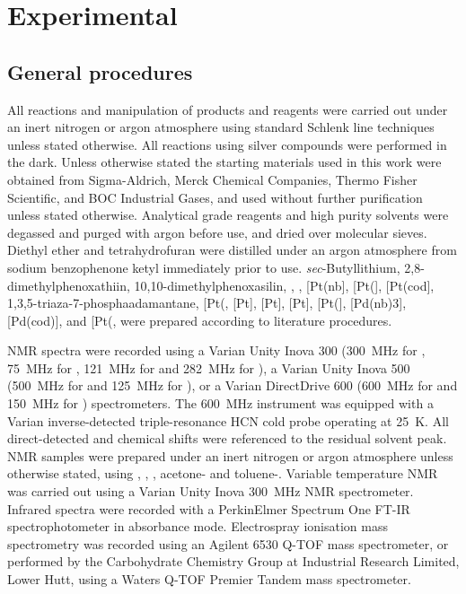 
\chapter{Experimental}
\label{ch:expt}

\section{General procedures}
\label{section:generalprocedures}

All reactions and manipulation of products and reagents were carried out under an inert nitrogen or argon atmosphere using standard Schlenk line techniques unless stated otherwise.  All reactions using silver compounds were performed in the dark.  Unless otherwise stated the starting materials used in this work were obtained from Sigma-Aldrich, Merck Chemical Companies, Thermo Fisher Scientific, and BOC Industrial Gases, and used without further purification unless stated otherwise.  Analytical grade reagents and high purity solvents were degassed and purged with argon before use, and dried over molecular sieves.  Diethyl ether and tetrahydrofuran were distilled under an argon atmosphere from sodium benzophenone ketyl immediately prior to use.  \emph{sec}-Butyllithium,\cite{Dieter2001} 2,8-dimethylphenoxathiin,\cite{Suter1938} 10,10-dimethylphenoxasilin,\cite{Kranenburg1995} ,\cite{Koshar1973} ,\cite{Giordano1979} [Pt(nb],\cite{Vaughan2011} [Pt(],\cite{Spencer1979} [Pt(cod],\cite{Crascall1990} 1,3,5-triaza-7-phosphaadamantane,\cite{Daigle1998a} [Pt(\ce{C6H10)Cl2]},\cite{Jensen1953} [Pt],\cite{Albrecht2000} [Pt],\cite{Hartley1979} [Pt]\cite{Cramer1967}, [Pt(]\cite{Bradthesis}, [Pd(nb{)3}]\cite{Green1977}, [Pd(cod)], and [Pt(\ce{C6H10)Me2]},\cite{Vaughan2011} were prepared according to literature procedures.  

NMR spectra were recorded using a Varian Unity Inova 300 (300~MHz for \proton, 75~MHz for \carbon, 121~MHz for \phosphorus{} and 282~MHz for \fluorine), a Varian Unity Inova 500 (500~MHz for \proton{} and 125~MHz for \carbon), or a Varian DirectDrive 600 (600~MHz for \proton and 150~MHz for \carbon{}) spectrometers.   The 600~MHz instrument was equipped with a Varian inverse-detected triple-resonance HCN cold probe operating at 25~K.  All direct-detected \proton{} and \carbon{} chemical shifts were referenced to the residual solvent peak.\cite{Fulmer2010}  NMR samples were prepared under an inert nitrogen or argon atmosphere unless otherwise stated, using , , , acetone- and toluene-.  Variable temperature NMR was carried out using a Varian Unity Inova 300~MHz NMR spectrometer.  Infrared spectra were recorded with a PerkinElmer Spectrum One FT-IR spectrophotometer in absorbance mode.  Electrospray ionisation mass spectrometry was recorded using an Agilent 6530 Q-TOF mass spectrometer, or performed by the Carbohydrate Chemistry Group at Industrial Research Limited, Lower Hutt, using a Waters Q-TOF Premier Tandem mass spectrometer.

